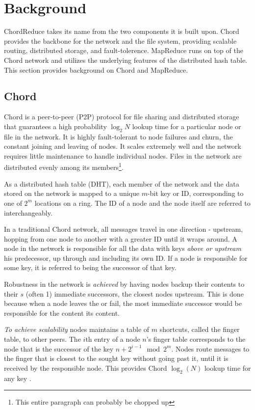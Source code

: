 \documentclass[10pt, conference, compsocconf]{IEEEtran}
\begin{document}
\section{Background}
ChordReduce takes its name from the two components it is built upon.  Chord\cite{Chord} provides the backbone for the network and the file system, providing scalable routing, distributed storage, and fault-tolerence.   MapReduce runs on top of the Chord network and utilizes the underlying features of the distributed hash table.  This section provides background on Chord and MapReduce.

\subsection{Chord}
Chord \cite{Chord} is a peer-to-peer (P2P) protocol for file sharing and distributed storage that guarantees a high probability $\log_{2} N$ lookup time for a particular node or file in the network. 
It is highly fault-tolerant to node failures and churn, the constant joining and leaving of nodes.  It scales extremely well and the network requires little maintenance to handle individual nodes.  
Files in the network are distributed evenly among its members\footnote{This entire paragraph can probably be chopped up}.

As a distributed hash table (DHT), each member of the network and the data stored on the network is mapped to a unique $m$-bit key or ID, corresponding to one of  $2^m$ locations on a ring. 
The ID of a node and the node itself are referred to interchangeably.

In a traditional Chord network, all messages travel in one direction - upstream, hopping from one node to another with a greater ID until it wraps around.
A node in the network is responsible for all the data with keys \textit{above or upstream} his predecessor, up through and including its own ID.  If a node is responsible for some key, it is referred to being the successor of that key.

Robustness in the network is \textit{achieved} by having nodes backup their contents to their $s$ (often 1) immediate successors, the closest nodes upstream.  
This is done because when a node leaves the or fail, the most immediate successor would be responsible for the content its content.

\textit{To achieve scalability} nodes maintains a table of $m$ shortcuts, called the finger table, to other peers.   The $i$th entry of a node $n$'s finger table corresponds to the node that is the successor of the key $n+2^{i-1} \mod 2^m $.  Nodes route messages to the finger that is closest to the sought key without going past it, until it is received by the responsible node.  This provides Chord $\log_2(N)$ lookup time for any key \cite{Chord}.
\end{document}
